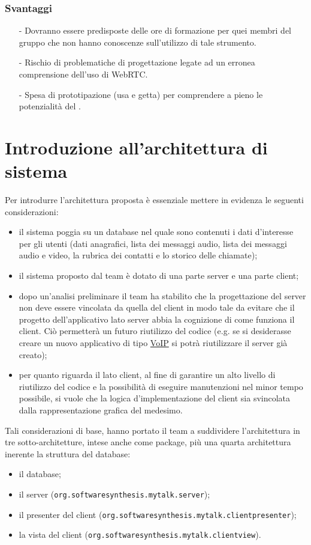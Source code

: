 \subsubsection*{Svantaggi}
\begin{itemize}[noitemsep,nolistsep]
  \item[-] Dovranno essere predisposte delle ore di formazione per quei membri del gruppo che non hanno conoscenze sull'utilizzo di tale strumento.
  \item[-] Rischio di problematiche di progettazione legate ad un erronea comprensione dell'uso di WebRTC.
  \item[-] Spesa di prototipazione (usa e getta) per comprendere a pieno le potenzialità del .
\end{itemize}

\clearpage

\section{Introduzione all'architettura di sistema}\label{sec:introdesign}
Per introdurre l'architettura proposta è essenziale mettere in evidenza le seguenti considerazioni:
\begin{itemize}
	\item il sistema poggia su un database nel quale sono contenuti i dati d'interesse per gli utenti (dati anagrafici, lista dei messaggi audio, lista dei messaggi audio e video, la rubrica dei contatti e lo storico delle chiamate);
	\item il sistema proposto dal team è dotato di una parte server e una parte client;
	\item dopo un'analisi preliminare il team ha stabilito che la progettazione del server non deve essere vincolata da quella del client in modo tale da evitare che il progetto dell'applicativo lato server abbia la cognizione di come funziona il client. Ciò permetterà un futuro riutilizzo del codice (e.g. se si desiderasse creare un nuovo applicativo di tipo \underline{VoIP} si potrà riutilizzare il server già creato);
	\item per quanto riguarda il lato client, al fine di garantire un alto livello di riutilizzo del codice e la possibilità di eseguire manutenzioni nel minor tempo possibile, si vuole che la logica d'implementazione del client sia svincolata dalla rappresentazione grafica del medesimo.
\end{itemize}

Tali considerazioni di base, hanno portato il team a suddividere l'architettura in tre sotto-architetture, intese anche come package, più una quarta architettura inerente la struttura del database:
\begin{itemize}
	\item il database;
	\item il server (\texttt{org.softwaresynthesis.mytalk.server});
	\item il presenter del client (\texttt{org.softwaresynthesis.mytalk.clientpresenter});
	\item la vista del client (\texttt{org.softwaresynthesis.mytalk.clientview}).
\end{itemize}

